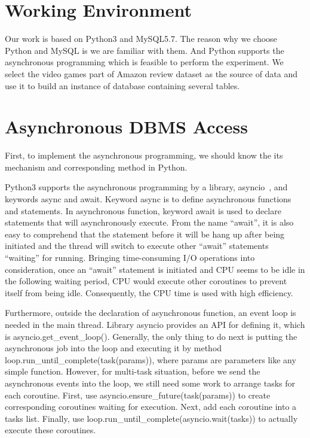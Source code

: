 \documentclass[onecolumn, conference, 12pt]{IEEEtran}
\begin{document}
	\section{Working Environment}
	Our work is based on Python3 and MySQL5.7. The reason why we choose Python and MySQL is we are familiar with them. And Python supports the asynchronous programming which is feasible to perform the experiment. We select the video games part of Amazon review dataset as the source of data and use it to build an instance of database containing several tables.

	\section{Asynchronous DBMS Access}
	First, to implement the asynchronous programming, we should know the its mechanism and corresponding method in Python. 

	Python3 supports the asynchronous programming by a library, asyncio~\cite{asyncio}, and keywords async and await. Keyword async is to define asynchronous functions and statements. In asynchronous function, keyword await is used to declare statements that will asynchronously execute. From the name ``await'', it is also easy to comprehend that the statement before it will be hang up after being initiated and the thread will switch to execute other ``await'' statements ``waiting'' for running. Bringing time-consuming I/O operations into consideration, once an ``await'' statement is initiated and CPU seems to be idle in the following waiting period, CPU would execute other coroutines to prevent itself from being idle. Consequently, the CPU time is used with high efficiency. 

	Furthermore, outside the declaration of asynchronous function, an event loop is needed in the main thread. Library asyncio provides an API for defining it, which is asyncio.get\_event\_loop(). Generally, the only thing to do next is putting the asynchronous job into the loop and executing it by method loop.run\_until\_complete(task(params)), where params are parameters like any simple function. However, for multi-task situation, before we send the asynchronous events into the loop, we still need some work to arrange tasks for each coroutine. First, use asyncio.ensure\_future(task(params)) to create corresponding coroutines waiting for execution. Next, add each coroutine into a tasks list. Finally, use loop.run\_until\_complete(asyncio.wait(tasks)) to actually execute these coroutines.
\end{document}
